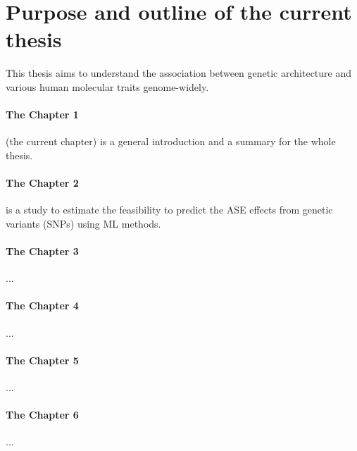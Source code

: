 \documentclass[12pt,usletter, fancy]{elegantbook}
\begin{document}
\begin{figure}[h]
\end{figure}

\section*{Purpose and outline of the current thesis}
This thesis aims to understand the association between genetic architecture and various human molecular traits genome-widely.
\paragraph*{The Chapter 1}(the current chapter) is a general introduction and a summary for the whole thesis.
\paragraph*{The Chapter 2} is a study to estimate the feasibility to predict the ASE effects from genetic variants (SNPs) using ML methods.
\paragraph*{The Chapter 3}...
\paragraph*{The Chapter 4}...
\paragraph*{The Chapter 5}...
\paragraph*{The Chapter 6}...
\end{document}
